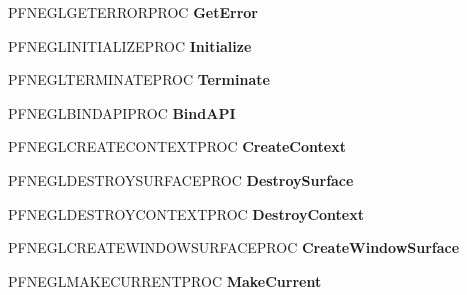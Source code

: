 \begin{DoxyCompactItemize}
\item 
\hypertarget{struct__GLFWlibraryEGL_a35431857ff27857953c4b07b6daaa1d7}{}P\+F\+N\+E\+G\+L\+G\+E\+T\+E\+R\+R\+O\+R\+P\+R\+O\+C {\bfseries Get\+Error}\label{struct__GLFWlibraryEGL_a35431857ff27857953c4b07b6daaa1d7}

\item 
\hypertarget{struct__GLFWlibraryEGL_a3daba04f0b2f27e85207a41caf076205}{}P\+F\+N\+E\+G\+L\+I\+N\+I\+T\+I\+A\+L\+I\+Z\+E\+P\+R\+O\+C {\bfseries Initialize}\label{struct__GLFWlibraryEGL_a3daba04f0b2f27e85207a41caf076205}

\item 
\hypertarget{struct__GLFWlibraryEGL_a57e580e049e4ec2d48807f4299b50c25}{}P\+F\+N\+E\+G\+L\+T\+E\+R\+M\+I\+N\+A\+T\+E\+P\+R\+O\+C {\bfseries Terminate}\label{struct__GLFWlibraryEGL_a57e580e049e4ec2d48807f4299b50c25}

\item 
\hypertarget{struct__GLFWlibraryEGL_ae4b0b267c61a7ea021935e7261943430}{}P\+F\+N\+E\+G\+L\+B\+I\+N\+D\+A\+P\+I\+P\+R\+O\+C {\bfseries Bind\+A\+P\+I}\label{struct__GLFWlibraryEGL_ae4b0b267c61a7ea021935e7261943430}

\item 
\hypertarget{struct__GLFWlibraryEGL_ad0bf666ed4049d4aec1d41bfa6961662}{}P\+F\+N\+E\+G\+L\+C\+R\+E\+A\+T\+E\+C\+O\+N\+T\+E\+X\+T\+P\+R\+O\+C {\bfseries Create\+Context}\label{struct__GLFWlibraryEGL_ad0bf666ed4049d4aec1d41bfa6961662}

\item 
\hypertarget{struct__GLFWlibraryEGL_afb9a2d95818a35398302a3e4017df431}{}P\+F\+N\+E\+G\+L\+D\+E\+S\+T\+R\+O\+Y\+S\+U\+R\+F\+A\+C\+E\+P\+R\+O\+C {\bfseries Destroy\+Surface}\label{struct__GLFWlibraryEGL_afb9a2d95818a35398302a3e4017df431}

\item 
\hypertarget{struct__GLFWlibraryEGL_ab315648bcc507f169d8989bc5a7cd8fd}{}P\+F\+N\+E\+G\+L\+D\+E\+S\+T\+R\+O\+Y\+C\+O\+N\+T\+E\+X\+T\+P\+R\+O\+C {\bfseries Destroy\+Context}\label{struct__GLFWlibraryEGL_ab315648bcc507f169d8989bc5a7cd8fd}

\item 
\hypertarget{struct__GLFWlibraryEGL_a4be438edeeda9f6614a1d511b82d5d36}{}P\+F\+N\+E\+G\+L\+C\+R\+E\+A\+T\+E\+W\+I\+N\+D\+O\+W\+S\+U\+R\+F\+A\+C\+E\+P\+R\+O\+C {\bfseries Create\+Window\+Surface}\label{struct__GLFWlibraryEGL_a4be438edeeda9f6614a1d511b82d5d36}

\item 
\hypertarget{struct__GLFWlibraryEGL_ade6b130f81ba2cf89e676edb785bd2fc}{}P\+F\+N\+E\+G\+L\+M\+A\+K\+E\+C\+U\+R\+R\+E\+N\+T\+P\+R\+O\+C {\bfseries Make\+Current}\label{struct__GLFWlibraryEGL_ade6b130f81ba2cf89e676edb785bd2fc}


\end{DoxyCompactItemize}
